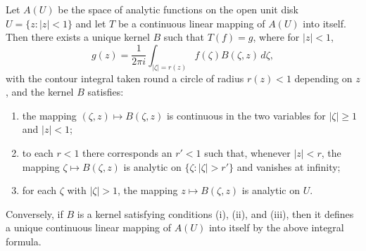 Let $A(U)$ be the space of analytic functions on the open unit disk $U = \{z : |z| < 1\}$ and let $T$ be a continuous linear mapping of $A(U)$ into itself. Then there exists a unique kernel $B$ such that $T(f) = g$, where for $|z| < 1$,
$$g(z) = \frac{1}{2\pi i} \int_{|\zeta| = r(z)} f(\zeta) B(\zeta,z) \, d\zeta,$$
with the contour integral taken round a circle of radius $r(z) < 1$ depending on $z$, and the kernel $B$ satisfies:
\begin{enumerate}
\item[(i)] the mapping $(\zeta,z) \mapsto B(\zeta,z)$ is continuous in the two variables for $|\zeta| \geq 1$ and $|z| < 1$;
\item[(ii)] to each $r < 1$ there corresponds an $r' < 1$ such that, whenever $|z| < r$, the mapping $\zeta \mapsto B(\zeta,z)$ is analytic on $\{\zeta : |\zeta| > r'\}$ and vanishes at infinity;
\item[(iii)] for each $\zeta$ with $|\zeta| > 1$, the mapping $z \mapsto B(\zeta,z)$ is analytic on $U$.
\end{enumerate}
Conversely, if $B$ is a kernel satisfying conditions (i), (ii), and (iii), then it defines a unique continuous linear mapping of $A(U)$ into itself by the above integral formula.
